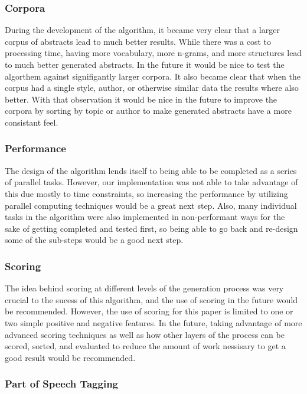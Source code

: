 \documentclass[letterpaper, 10 pt, conference]{ieeeconf}  %
\begin{document}
\subsubsection{Corpora}

During the development of the algorithm, it became very clear that a larger corpus of abstracts lead to much better results. While there was a cost to processing time, having more vocabulary, more n-grams, and more structures lead to much better generated abstracts. In the future it would be nice to test the algorthem against signifigantly larger corpora. It also became clear that
when the corpus had a single style, author, or otherwise similar data the results where also better. With that observation it would be nice in the future to improve the corpora by sorting by topic or author to make generated abstracts have a more consistant feel.

\subsubsection{Performance}

The design of the algorithm lends itself to being able to be completed as a series of parallel tasks. However, our implementation was not able to take advantage of this due mostly to time constraints, so increasing the performance by utilizing parallel computing techniques would be a great next step. Also, many individual tasks in the algorithm were also implemented in non-performant ways for the sake of getting completed and tested first, so being able to go back and re-design some of the sub-steps would be a good next step.

\subsubsection{Scoring}

The idea behind scoring at different levels of the generation process was very crucial to the sucess of this algorithm, and the use of scoring in the future would be recommended. However, the use of scoring for this paper is limited to one or two simple positive and negative features. In the future, taking advantage of more advanced scoring techniques as well as how other layers of the process can be scored, sorted, and evaluated to reduce the amount of work nessisary to get a good result would be recommended.

\subsubsection{Part of Speech Tagging}
\end{document}
